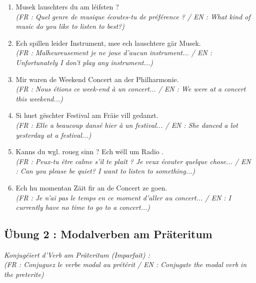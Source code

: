 \begin{enumerate}
    \item \underline{\hspace{3cm}} Musek lauschters du am léifsten ? \\
    \small\textit{(FR : Quel genre de musique écoutes-tu de préférence ? / EN : What kind of music do you like to listen to best?)}
    \item Ech spillen leider \underline{\hspace{2.5cm}} Instrument, mee ech lauschtere gär Musek. \\
    \small\textit{(FR : Malheureusement je ne joue d'aucun instrument... / EN : Unfortunately I don't play any instrument...)}
    \item Mir waren de Weekend \underline{\hspace{3cm}} Concert an der Philharmonie. \\
    \small\textit{(FR : Nous étions ce week-end à un concert... / EN : We were at a concert this weekend...)}
    \item Si huet gëschter \underline{\hspace{3cm}} Festival am Fräie vill gedanzt. \\
    \small\textit{(FR : Elle a beaucoup dansé hier à un festival... / EN : She danced a lot yesterday at a festival...)}
    \item Kanns du wgl. roueg sinn ? Ech wëll \underline{\hspace{2.5cm}} um Radio \underline{\hspace{2.5cm}}. \\
    \small\textit{(FR : Peux-tu être calme s'il te plaît ? Je veux écouter quelque chose... / EN : Can you please be quiet? I want to listen to something...)}
    \item Ech hu momentan \underline{\hspace{2.5cm}} Zäit fir an de Concert ze goen. \\
    \small\textit{(FR : Je n'ai pas le temps en ce moment d'aller au concert... / EN : I currently have no time to go to a concert...)}
\end{enumerate}

\subsection*{Übung 2 : Modalverben am Präteritum}
\textit{Konjugéiert d'Verb am Präteritum (Imparfait) :} \\
\textit{\small(FR : Conjuguez le verbe modal au prétérit / EN : Conjugate the modal verb in the preterite)}

